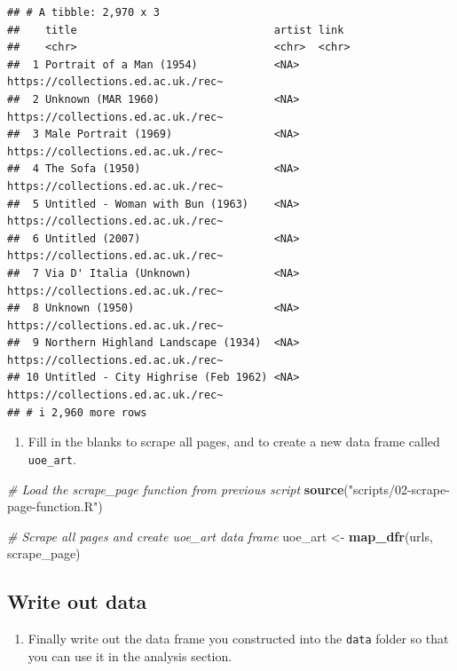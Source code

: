 \documentclass[
]{article}
\newenvironment{Shaded}{\begin{snugshade}}{\end{snugshade}}
\newcommand{\CommentTok}[1]{\textcolor[rgb]{0.56,0.35,0.01}{\textit{#1}}}
\newcommand{\FunctionTok}[1]{\textcolor[rgb]{0.13,0.29,0.53}{\textbf{#1}}}
\newcommand{\NormalTok}[1]{#1}
\newcommand{\OtherTok}[1]{\textcolor[rgb]{0.56,0.35,0.01}{#1}}
\newcommand{\StringTok}[1]{\textcolor[rgb]{0.31,0.60,0.02}{#1}}
\providecommand{\tightlist}{%
  \setlength{\itemsep}{0pt}\setlength{\parskip}{0pt}}
\begin{document}
\begin{verbatim}
## # A tibble: 2,970 x 3
##    title                               artist link                              
##    <chr>                               <chr>  <chr>                             
##  1 Portrait of a Man (1954)            <NA>   https://collections.ed.ac.uk./rec~
##  2 Unknown (MAR 1960)                  <NA>   https://collections.ed.ac.uk./rec~
##  3 Male Portrait (1969)                <NA>   https://collections.ed.ac.uk./rec~
##  4 The Sofa (1950)                     <NA>   https://collections.ed.ac.uk./rec~
##  5 Untitled - Woman with Bun (1963)    <NA>   https://collections.ed.ac.uk./rec~
##  6 Untitled (2007)                     <NA>   https://collections.ed.ac.uk./rec~
##  7 Via D' Italia (Unknown)             <NA>   https://collections.ed.ac.uk./rec~
##  8 Unknown (1950)                      <NA>   https://collections.ed.ac.uk./rec~
##  9 Northern Highland Landscape (1934)  <NA>   https://collections.ed.ac.uk./rec~
## 10 Untitled - City Highrise (Feb 1962) <NA>   https://collections.ed.ac.uk./rec~
## # i 2,960 more rows
\end{verbatim}

\begin{enumerate}
\def\labelenumi{\arabic{enumi}.}
\setcounter{enumi}{6}
\tightlist
\item
  Fill in the blanks to scrape all pages, and to create a new data frame
  called \texttt{uoe\_art}.
\end{enumerate}

\begin{Shaded}
\begin{Highlighting}[]
\CommentTok{\# Load the scrape\_page function from previous script}
\FunctionTok{source}\NormalTok{(}\StringTok{"scripts/02{-}scrape{-}page{-}function.R"}\NormalTok{)}

\CommentTok{\# Scrape all pages and create uoe\_art data frame}
\NormalTok{uoe\_art }\OtherTok{\textless{}{-}} \FunctionTok{map\_dfr}\NormalTok{(urls, scrape\_page)}
\end{Highlighting}
\end{Shaded}

\subsection{Write out data}\label{write-out-data}

\begin{enumerate}
\def\labelenumi{\arabic{enumi}.}
\setcounter{enumi}{7}
\tightlist
\item
  Finally write out the data frame you constructed into the
  \texttt{data} folder so that you can use it in the analysis section.
\end{enumerate}
\end{document}
